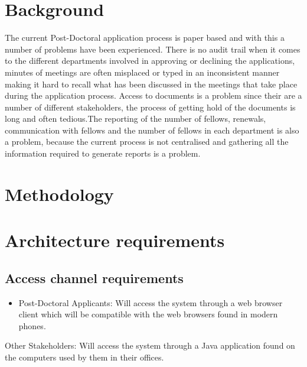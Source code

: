 \documentclass[12pt]{article}
\begin{document}
	\newpage
	\section{Background} %
	\vspace{0.2in}
	The current Post-Doctoral application process is paper based and with this a number of problems have been experienced. There is no audit trail when it comes to the different departments involved in approving or declining the applications, minutes of meetings are often misplaced or typed in an inconsistent manner making it hard to recall what has been discussed in the meetings that take place during the application process. Access to documents is a problem since their are a number of different stakeholders, the process of getting hold of the documents is long and often tedious.The reporting of the number of fellows, renewals, communication with fellows and the number of fellows in each department is also a problem, because the current process is not centralised and gathering all the information required to generate reports is a problem.
	\vspace{0.5in}
	
	\newpage
	\section{Methodology} %
	\vspace{0.2in}
	
	\vspace{0.5in}
	
	\newpage
	\section{Architecture requirements}
		\subsection{Access channel requirements} %
		\vspace{0.2in}
		\begin{itemize}
		\item Post-Doctoral Applicants: Will access the system through a web browser client which will be compatible with the web browsers found in modern phones. 
		\end{itemize}
		\item Other Stakeholders: Will access the system through a Java application found on the computers used by them in their offices.
		\item %
		\vspace{0.2in}
		
\end{document}
